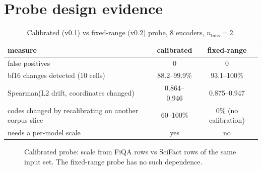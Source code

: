 \documentclass{article}
\begin{document}
\section{Probe design evidence}\label{app:probe}
\begin{table}[h]\centering\footnotesize
\caption{Calibrated (v0.1) vs fixed-range (v0.2) probe, 8 encoders, $n_{\text{bins}}=2$.}
\begin{tabular}{lcc}
\toprule
measure & calibrated & fixed-range \\
\midrule
false positives & 0 & 0 \\
bf16 changes detected (10 cells) & 88.2--99.9\% & 93.1--100\% \\
Spearman(L2 drift, coordinates changed) & 0.864--0.946 & 0.875--0.947 \\
codes changed by recalibrating on another corpus slice & 60--100\% & 0\% (no calibration) \\
needs a per-model scale & yes & no \\
\bottomrule
\end{tabular}
\end{table}
\begin{figure}[h]\centering
{}
\caption{Calibrated probe: scale from FiQA rows vs SciFact rows of the same input set. The fixed-range probe has no such dependence.}
\end{figure}
\end{document}
